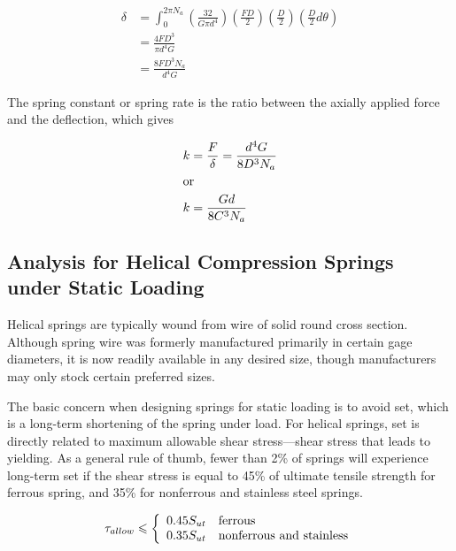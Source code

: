 \documentclass[
10pt,
a4paper,
openany,
svgnames,
]{book}
\begin{document}
\begin{align*}
  \delta  &= \int_0^{2\pi N_a} \left( \frac{32}{G\pi d^4} \right)\left( \frac{FD}{2} \right)\left( \frac{D}{2} \right)\left( \frac{D}{2}d\theta  \right) \\ 
          &= \frac{4FD^3}{\pi d^4G} \\ 
          &= \frac{8FD^3N_a}{d^4G}
\end{align*}

The spring constant or spring rate is the ratio between the axially applied force and the deflection, which gives

\begin{equation} \label{eqn: spring constant}
  \begin{gathered}
    k = \frac{F}{\delta} = \frac{d^4G}{8D^3N_a} \hfill \\
    \text{or} \hfill \\
    k = \frac{Gd}{8C^3N_a} \hfill \\ 
  \end{gathered}
\end{equation}

\subsection{Analysis for Helical Compression Springs under Static Loading}

Helical springs are typically wound from wire of solid round cross section. Although spring wire was formerly manufactured primarily in certain gage diameters, it is now readily available in any desired size, though manufacturers may only stock certain preferred sizes.

The basic concern when designing springs for static loading is to avoid set, which is a long-term shortening of the spring under load. For helical springs, set is directly related to maximum allowable shear stress—shear stress that leads to yielding. As a general rule of thumb, fewer than 2\% of springs will experience long-term set if the shear stress is equal to 45\% of ultimate tensile strength for ferrous spring, and 35\% for nonferrous and stainless steel springs.

\begin{equation}
  \tau_{allow} \leqslant \left\{
    \begin{array}{ll}
       0.45 S_{ut} & \text{ferrous} \hfill \\ 
       0.35 S_{ut} & \text{nonferrous and stainless} 
     \end{array} \right.
\end{equation}
\end{document}
